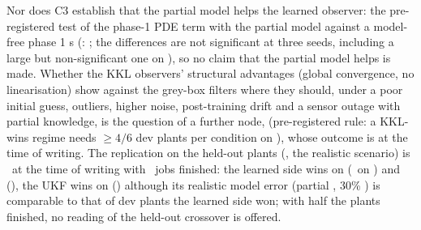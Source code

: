Nor does C3 establish that the partial model helps the learned observer: the pre-registered test of the phase-1 PDE term with the partial model against a model-free phase 1 \FAIL s (: \OutcomeCThreePartialModelfree; the differences are not significant at three seeds, including a large but non-significant one on ), so no claim that the partial model helps is made. Whether the KKL observers' structural advantages (global convergence, no linearisation) show against the grey-box filters where they should, under a poor initial guess, outliers, higher noise, post-training drift and a sensor outage with partial knowledge, is the question of a further node,  (pre-registered rule: a KKL-wins regime needs $\ge4/6$ dev plants per condition on ), whose outcome is \textcolor{red}{\textbf{\OutcomeCThreeRegimes}} at the time of writing. The replication on the held-out plants (, the realistic scenario) is \OutcomeTESTCThree\ at the time of writing with \JobsTESTCThree\ jobs finished: the learned side wins on  (\CthreeTESTCThreeSeqFhnVsWorking\ on ) and  (\CthreeTESTCThreeSeqHighwayTrafficVsWorking), the UKF wins on  (\CthreeTESTCThreeSeqCartpoleVsWorking) although its realistic model error (partial \ModelErrCartpolePartial, 30\% \ModelErrCartpoleMismatchThirty) is comparable to that of dev plants the learned side won; with half the plants finished, no reading of the held-out crossover is offered.

